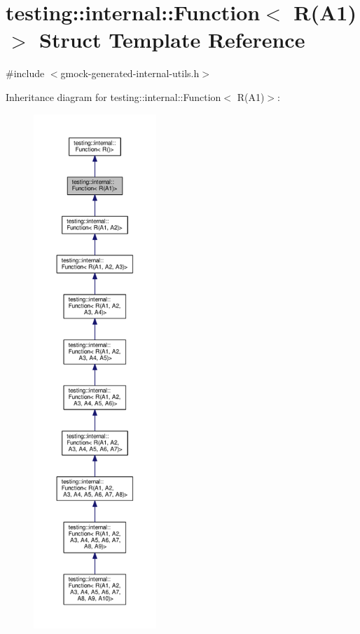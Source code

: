 \hypertarget{structtesting_1_1internal_1_1Function_3_01R_07A1_08_4}{}\section{testing\+:\+:internal\+:\+:Function$<$ R(A1)$>$ Struct Template Reference}
\label{structtesting_1_1internal_1_1Function_3_01R_07A1_08_4}


{\ttfamily \#include $<$gmock-\/generated-\/internal-\/utils.\+h$>$}



Inheritance diagram for testing\+:\+:internal\+:\+:Function$<$ R(A1)$>$\+:\nopagebreak
\begin{figure}[H]
\begin{center}
\leavevmode
\includegraphics[height=550pt]{structtesting_1_1internal_1_1Function_3_01R_07A1_08_4__inherit__graph}
\end{center}
\end{figure}



